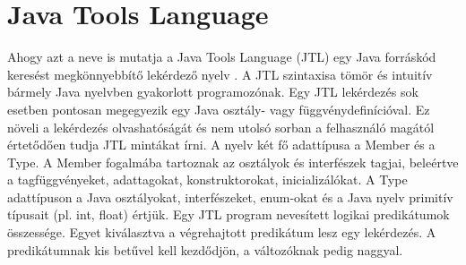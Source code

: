 \documentclass[a4paper,12pt]{report}
\begin{document}
\section{Java Tools Language}
\par Ahogy azt a neve is mutatja a Java Tools Language (JTL) egy Java forráskód keresést megkönnyebbítő lekérdező nyelv \cite{jtl}. A JTL szintaxisa tömör és intuitív bármely Java nyelvben gyakorlott programozónak. Egy JTL lekérdezés sok esetben pontosan megegyezik egy Java osztály- vagy függvénydefinícióval. Ez növeli a lekérdezés olvashatóságát és nem utolsó sorban a felhasználó magától értetődően tudja JTL mintákat írni. A nyelv két fő adattípusa a Member és a Type. A Member fogalmába tartoznak az osztályok és interfészek tagjai, beleértve a tagfüggvényeket, adattagokat, konstruktorokat, inicializálókat. A Type adattípuson a Java osztályokat, interfészeket, enum-okat és a Java nyelv primitív típusait (pl. int, float) értjük. Egy JTL program nevesített logikai predikátumok összessége.  Egyet kiválasztva a végrehajtott predikátum lesz egy lekérdezés. A predikátumnak kis betűvel kell kezdődjön, a változóknak pedig naggyal.
\end{document}
